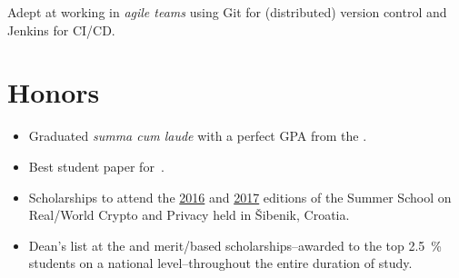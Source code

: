 \documentclass[%
version=last,%
fontsize=11pt,%
paper=A4,%
headinclude=false,%
footinclude=false,%
headlines=0,%
footlines=0,%
areasetadvanced,%
toc=bibnumbered,%
]{scrartcl}%
\begin{document}
\begin{minipage}[t]{.4\textwidth}
  \begingroup%
  \small%
  Adept at working in \emph{agile teams} using Git for (distributed) version
  control and Jenkins for CI/CD\@.\par%
  \endgroup%

  \section{Honors}%
  \label{sec:honors}

  \begin{itemize}[leftmargin=*]
  \item Graduated \emph{summa cum laude} with a perfect GPA from the
    .
  \item Best student paper
    for~\autocite{Gjorgjevski:Combining_LWE-Solving_Algorithms}.
  \item Scholarships to attend the
    \href{http://summerschool-croatia.cs.ru.nl/2016/}{2016} and
    \href{http://summerschool-croatia.cs.ru.nl/2017/}{2017} editions of the
    Summer School on Real\-/World Crypto and Privacy held in Šibenik, Croatia.
  \item Dean’s list at the  and merit\-/based scholarships\---awarded to the top
    \SI{2.5}{\percent} students on a national level\---throughout the entire
    duration of study.
  \end{itemize}
\end{minipage}
\end{document}
